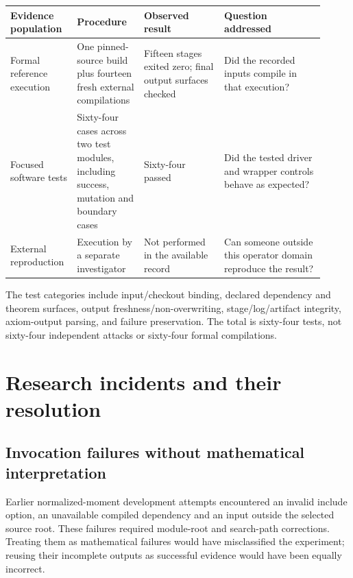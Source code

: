 \documentclass[11pt,a4paper]{article}
\begin{document}
\begingroup\small\setlength{\tabcolsep}{4pt}
\begin{longtable}{@{}>{\raggedright\arraybackslash}p{0.17\linewidth}>{\raggedright\arraybackslash}p{0.2\linewidth}>{\raggedright\arraybackslash}p{0.24\linewidth}>{\raggedright\arraybackslash}p{0.3\linewidth}@{}}
\toprule
\textbf{Evidence population} & \textbf{Procedure} & \textbf{Observed result} & \textbf{Question addressed} \\
\midrule
\endhead
Formal reference execution & One pinned-source build plus fourteen fresh external compilations & Fifteen stages exited zero; final output surfaces checked & Did the recorded inputs compile in that execution? \\
Focused software tests & Sixty-four cases across two test modules, including success, mutation and boundary cases & Sixty-four passed & Did the tested driver and wrapper controls behave as expected? \\
External reproduction & Execution by a separate investigator & Not performed in the available record & Can someone outside this operator domain reproduce the result? \\
\bottomrule
\end{longtable}
\endgroup

The test categories include input/checkout binding, declared dependency and theorem surfaces, output freshness/non-overwriting, stage/log/artifact integrity, axiom-output parsing, and failure preservation. The total is sixty-four tests, not sixty-four independent attacks or sixty-four formal compilations.

\section{Research incidents and their resolution}

\subsection{Invocation failures without mathematical interpretation}

Earlier normalized-moment development attempts encountered an invalid include option, an unavailable compiled dependency and an input outside the selected source root. These failures required module-root and search-path corrections. Treating them as mathematical failures would have misclassified the experiment; reusing their incomplete outputs as successful evidence would have been equally incorrect.
\end{document}
